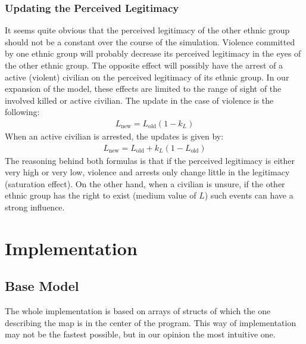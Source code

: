 \documentclass[11pt]{article}
\begin{document}
\subsubsection{Updating the Perceived Legitimacy}
It seems quite obvious that the perceived legitimacy of the other ethnic group should not be a constant over the course of the simulation. Violence committed by one ethnic group will probably decrease its perceived legitimacy in the eyes of the other ethnic group. The opposite effect will possibly have the arrest of a active (violent) civilian on the perceived legitimacy of its ethnic group. In our expansion of the model, these effects are limited to the range of sight of the involved killed or active civilian. The update in the case of violence is the following:
\begin{align}
L_{\text{new}} = L_{\text{old}} \left( 1 - k_L \right)
\end{align}
When an active civilian is arrested, the updates is given by:
\begin{align}
L_{\text{new}} = L_{\text{old}} + k_L \left( 1 - L_{\text{old}} \right)
\end{align}
The reasoning behind both formulas is that if the perceived legitimacy is either very high or very low, violence and arrests only change little in the legitimacy (saturation effect). On the other hand, when a civilian is unsure, if the other ethnic group has the right to exist (medium value of $L$) such events can have a strong influence.

\section{Implementation}

\subsection{Base Model}
The whole implementation is based on arrays of structs of which the one describing the map is in the center of the program. This way of implementation may not be the fastest possible, but in our opinion the most intuitive one.
\end{document}

